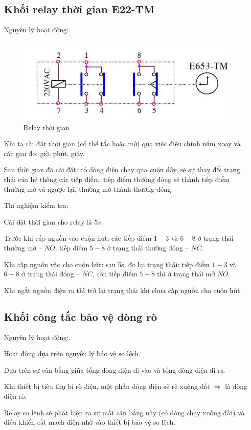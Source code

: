 \documentclass[13pt,a4paper]{extarticle}
\begin{document}
\subsection{Khối relay thời gian E22-TM}
Nguyên lý hoạt động:
\begin{figure}[!h]
\begin{center}
\includegraphics[scale=.7]{relay-timer}
\end{center}
\caption{Relay thời gian}
\end{figure}
\begin{list}{--}{}
\item Khi ta cài đặt thời gian (có thể tắc hoặc mở) qua việc điều chỉnh núm xoay và các giai đo: giờ, phút, giây.
\item Sau thời gian đã cài đặt: có dòng điện chạy qua cuộn dây, sẽ sự thay đổi trạng thái của hệ thống các tiếp điểm: tiếp điểm thường đóng sẽ thành tiếp điểm thường mở và ngược lại, thường mở thành thường đóng.
\end{list}
Thí nghiệm kiểm tra:
\begin{list}{--}{}
\item Cài đặt thời gian cho relay là $5s$.
\item Trước khi cấp nguồn vào cuộn hút: các tiếp điểm  $1-3$ và $6-8$ ở trạng thái thường mở -- $NO$, tiếp điểm $5-8$ ở trạng thái thường đóng -- $NC$.
\item Khi cấp nguồn vào cho cuộn hút: sau 5s, đo lại trạng thái: tiếp điểm $1-3$ và $6-8$ ở trạng thái đóng -- $NC$, còn tiếp điểm $5-8$ thì ở trạng thái mở $NO$.
\item Khi ngắt nguồn điện ra thì trở lại trạng thái khi chưa cấp nguồn cho cuộn hút.
\end{list}
\newpage
\subsection{Khối công tắc bảo vệ dòng rò}
Nguyên lý hoạt động:
\begin{list}{--}{}
\item Hoạt động dựa trên nguyên lý bảo vệ so lệch.
\item Dựa trên sự cân bằng giữa tổng dòng điện đi vào và tổng dòng điện đi ra.
\item Khi thiết bị tiêu thụ bị rò điện, một phần dòng điện sẽ rẽ xuống đất $\Longrightarrow$ là dòng điện rò.
\item Relay so lệnh sẽ phát hiện ra sự mất cân bằng này (có dòng chạy xuống đất) và điều khiển cắt mạch điện nhờ vào thiết bị bảo vệ so lệch.
\end{list}
\end{document}
